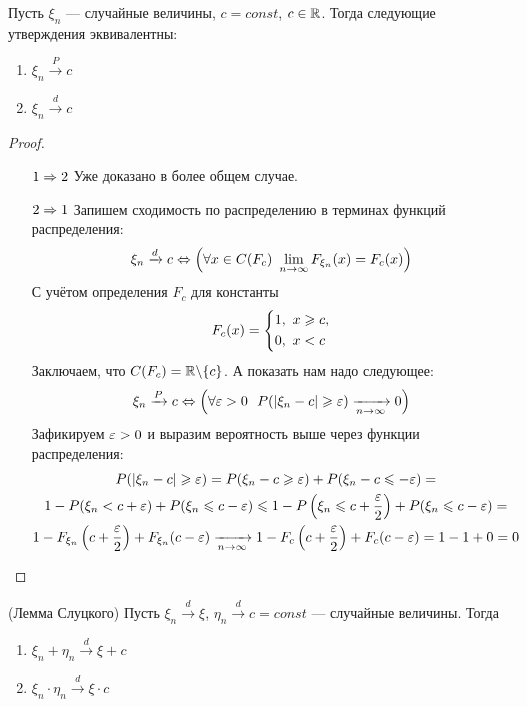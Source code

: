 \begin{lemma}
    Пусть $\xi_n$ --- случайные величины, $c = const$, $c \in \mathbb{R}$. Тогда следующие утверждения эквивалентны:
    \begin{enumerate}
        \item $\xi_n \xrightarrow{P} c$
        \item $\xi_n \xrightarrow{d} c$
    \end{enumerate}
\end{lemma}

\begin{proof}~
    \begin{itemize}
        \item[$1 \Rightarrow 2$] Уже доказано в более общем случае.

        \item[$2 \Rightarrow 1$] Запишем сходимость по распределению в терминах функций распределения:
        \[
            \xi_n \xrightarrow{d} c \Leftrightarrow \Big(\forall x \in C(F_c)\ \lim_{n \to \infty} F_{\xi_n}(x) = F_c(x)\Big)
        \]
		С учётом определения $F_c$ для константы
        \[
            F_c(x) = \left\{\begin{aligned}
                        & 1,\ x \geqslant c,
                        \\
                        & 0,\ x < c
                    \end{aligned}\right.
        \]
        Заключаем, что $C(F_c) = \mathbb{R} \backslash \{c\}$. А показать нам надо следующее:
        \[
            \xi_n \xrightarrow{P} c \Leftrightarrow \Big(\forall \varepsilon > 0\ \ P(|\xi_n - c| \geqslant \varepsilon) \xrightarrow[n \to \infty]{} 0\Big)
        \]
		Зафикируем $\varepsilon > 0$ и выразим вероятность выше через функции распределения:
        \begin{multline*}
            P(|\xi_n - c| \geqslant \varepsilon) = P(\xi_n - c \geqslant \varepsilon) + P(\xi_n - c \leqslant -\varepsilon) =
            \\
            1 - P(\xi_n < c + \varepsilon) + P(\xi_n \leqslant c - \varepsilon) \leqslant 1 - P \left(\xi_n \leqslant c + \frac{\varepsilon}{2}\right) + P(\xi_n \leqslant c - \varepsilon) =
            \\
            1 - F_{\xi_n} \left(c + \frac{\varepsilon}{2}\right) + F_{\xi_n}(c - \varepsilon) \xrightarrow[n \to \infty]{} 1 - F_c \left(c + \frac{\varepsilon}{2}\right) + F_c(c - \varepsilon) = 1 - 1 + 0 = 0
        \end{multline*}
    \end{itemize}
\end{proof}

\begin{theorem} (Лемма Слуцкого)
    Пусть $\xi_n \xrightarrow{d} \xi$, $\eta_n \xrightarrow{d} c = const$ --- случайные величины. Тогда
    \begin{enumerate}
        \item $\xi_n + \eta_n \xrightarrow{d} \xi + c$
        
        \item $\xi_n \cdot \eta_n \xrightarrow{d} \xi \cdot c$
    \end{enumerate}
\end{theorem}

